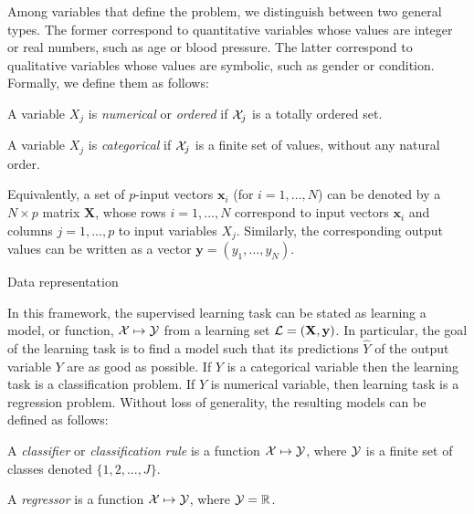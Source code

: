 Among variables that define the problem, we distinguish between two general
types. The former correspond to quantitative variables whose values are integer
or real numbers, such as age or blood pressure. The latter correspond to
qualitative variables whose values are symbolic, such as gender or condition.
Formally, we define them as follows:

\begin{definition}
A variable $X_j$ is \emph{numerical} or \emph{ordered} if ${\cal X}_j$ is a
totally ordered set.
\end{definition}

\begin{definition}
A variable $X_j$ is \emph{categorical} if ${\cal X}_j$ is a finite set of values,
without any natural order.
\end{definition}

Equivalently, a set of $p$-input vectors $\mathbf{x}_i$ (for $i=1, ..., N$) can
be denoted by a $N\times p$ matrix $\mathbf{X}$, whose rows $i=1, ..., N$
correspond to input vectors $\mathbf{x}_i$ and columns $j=1, ..., p$ to input
variables $X_j$. Similarly, the corresponding output values can be written as a
vector $\mathbf{y}=(y_1, ..., y_N)$.

\begin{remark}{Data representation}
\todo{}
\end{remark}

In this framework, the supervised learning task can be stated as learning a
model, or function, ${\cal X} \mapsto {\cal Y}$ from a learning set ${\cal
L}=(\mathbf{X}, \mathbf{y})$. In particular, the goal of the learning task is
to find a model such that its predictions $\hat{Y}$ of the output variable $Y$
are as good as possible. If $Y$ is a categorical variable then the learning
task is a classification problem. If $Y$ is numerical variable, then learning
task is a regression problem. Without loss of generality, the resulting models
can be defined as follows:

\begin{definition}
A \emph{classifier} or \emph{classification rule} is a function ${\cal X}
\mapsto {\cal Y}$, where ${\cal Y}$ is a finite set of classes denoted $\{1, 2, ..., J\}$.
\end{definition}

\begin{definition}
A \emph{regressor} is a function ${\cal X} \mapsto {\cal Y}$, where ${\cal Y}=\mathbb{R}$.
\end{definition}

